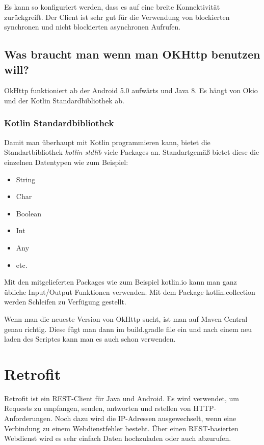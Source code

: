 Es kann so konfiguriert werden, dass es auf eine breite Konnektivität zurückgreift.
Der Client ist sehr gut für die Verwendung von blockierten synchronen und nicht blockierten asynchronen Aufrufen.

\subsection{Was braucht man wenn man OKHttp benutzen will?}
OkHttp funktioniert ab der Android 5.0 aufwärts und Java 8. 
Es hängt von Okio und der Kotlin Standardbibliothek ab.   

\subsubsection{Kotlin Standardbibliothek}
\cite{Kotlin-Standartbibliothek}
Damit man überhaupt mit Kotlin programmieren kann, bietet die Standartbibliothek \textit{kotlin-stdlib} viele Packages an.
Standartgemäß bietet diese die einzelnen Datentypen wie zum Beispiel:

\begin{itemize}
    \item String
    \item Char
    \item Boolean
    \item Int
    \item Any
    \item etc.
\end{itemize}

Mit den mitgelieferten Packages wie zum Beispiel kotlin.io kann man ganz übliche Input/Output Funktionen verwenden.
Mit dem Package kotlin.collection werden Schleifen zu Verfügung gestellt.

Wenn man die neueste Version von OkHttp sucht, ist man auf Maven Central genau richtig.
Diese fügt man dann im build.gradle file ein und nach einem neu laden des Scriptes kann man es auch schon verwenden.

\section{Retrofit}
\cite{Retrofit}
\author{Bozidar Spasenovic}

Retrofit ist ein REST-Client für Java und Android.
Es wird verwendet, um Requests zu empfangen, senden, antworten und rstellen von HTTP-Anforderungen.
Noch dazu wird die IP-Adressen ausgewechselt, wenn eine Verbindung zu einem Webdienstfehler besteht.
Über einen REST-basierten Webdienst wird es sehr einfach Daten hochzuladen oder auch abzurufen. 

